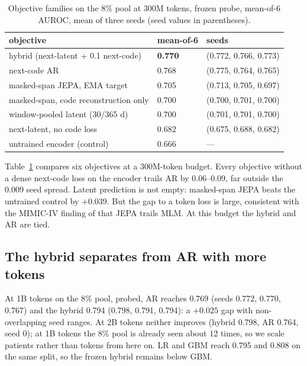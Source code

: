 \documentclass[10pt,letterpaper]{article}
\begin{document}
\begin{table}[t]
\centering\small
\caption{Objective families on the 8\% pool at 300M tokens, frozen probe,
mean-of-6 AUROC, mean of three seeds (seed values in parentheses).}
\label{tab:objectives}
\begin{tabular}{lll}
\toprule
objective & mean-of-6 & seeds \\
\midrule
hybrid (next-latent + 0.1 next-code)      & \textbf{0.770} & (0.772, 0.766, 0.773) \\
next-code AR                              & 0.768 & (0.775, 0.764, 0.765) \\
masked-span JEPA, EMA target              & 0.705 & (0.713, 0.705, 0.697) \\
masked-span, code reconstruction only     & 0.700 & (0.700, 0.701, 0.700) \\
window-pooled latent (30/365 d)           & 0.700 & (0.701, 0.701, 0.700) \\
next-latent, no code loss                 & 0.682 & (0.675, 0.688, 0.682) \\
\midrule
untrained encoder (control)               & 0.666 & --- \\
\bottomrule
\end{tabular}
\end{table}

Table~\ref{tab:objectives} compares six objectives at a 300M-token budget.
Every objective without a dense next-code loss on the encoder trails AR by
0.06--0.09, far outside the 0.009 seed spread. Latent prediction is not empty:
masked-span JEPA beats the untrained control by $+0.039$. But the gap to a
token loss is large, consistent with the MIMIC-IV finding of
\citet{imperialjepa} that JEPA trails MLM. At this budget the hybrid and AR are
tied.

\subsection{The hybrid separates from AR with more tokens}

At 1B tokens on the 8\% pool, probed, AR reaches 0.769 (seeds 0.772, 0.770,
0.767) and the hybrid 0.794 (0.798, 0.791, 0.794): a $+0.025$ gap with
non-overlapping seed ranges. At 2B tokens neither improves (hybrid 0.798, AR
0.764, seed 0); at 1B tokens the 8\% pool is already seen about 12 times, so we
scale patients rather than tokens from here on. LR and GBM reach 0.795 and
0.808 on the same split, so the frozen hybrid remains below GBM.
\end{document}
